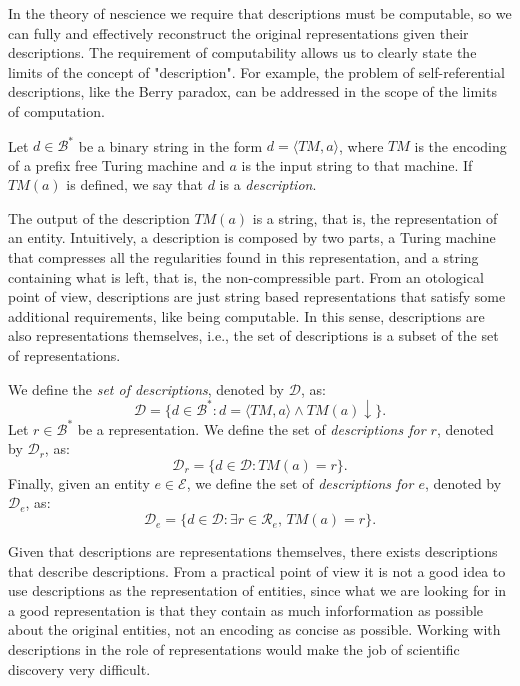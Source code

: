 In the theory of nescience we require that descriptions must be computable, so we can fully and effectively reconstruct the original representations given their descriptions. The requirement of computability allows us to clearly state the limits of the concept of "description". For example, the problem of self-referential descriptions, like the Berry paradox, can be addressed in the scope of the limits of computation.

\begin{definition} [Model]
\label{def:descriptions_model}
Let $d \in \mathcal{B}^\ast$ be a binary string in the form $d = \langle TM,a \rangle$, where $TM$ is the encoding of a prefix free Turing machine and $a$ is the input string to that machine. If $TM(a)$ is defined, we say that $d$ is a \emph{description}. 
\end{definition}

The output of the description $TM(a)$ is a string, that is, the representation of an entity. Intuitively, a description is composed by two parts, a Turing machine that compresses all the regularities found in this representation, and a string containing what is left, that is, the non-compressible part. From an otological point of view, descriptions are just string based representations that satisfy some additional requirements, like being computable. In this sense, descriptions are also representations themselves, i.e., the set of descriptions is a subset of the set of representations.

\begin{definition}
\label{def:descriptions_model}
We define the \emph{set of descriptions}, denoted by $\mathcal{D}$, as:
\[
\mathcal{D} = \{ d \in \mathcal{B}^\ast : d = \langle TM,a \rangle \wedge TM(a) \downarrow \}.
\]
Let $r \in \mathcal{B}^\ast$ be a representation. We define the set of \emph{descriptions for $r$}, denoted by $\mathcal{D}_r$, as:
\[
\mathcal{D}_r = \{ d \in \mathcal{D} : TM(a) = r \}.
\]
Finally, given an entity $e \in \mathcal{E}$, we define the set of \emph{descriptions for $e$}, denoted by $\mathcal{D}_e$, as:
\[
\mathcal{D}_e = \{ d \in \mathcal{D} : \exists r \in \mathcal{R}_e,\, TM(a) = r \}.
\]
\end{definition}

Given that descriptions are representations themselves, there exists descriptions that describe descriptions. From a practical point of view it is not a good idea to use descriptions as the representation of entities, since what we are looking for in a good representation is that they contain as much inforformation as possible about the original entities, not an encoding as concise as possible. Working with descriptions in the role of representations would make the job of scientific discovery very difficult.

